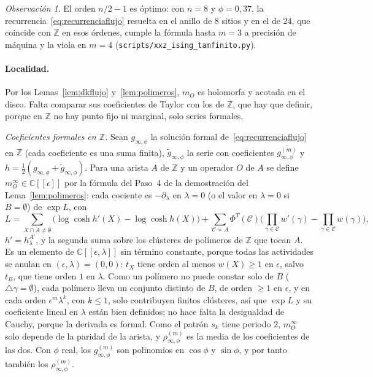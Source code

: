 \documentclass[11pt,a4paper]{article}
\theoremstyle{remark}
\newtheorem*{observacion}{Observación}
\begin{document}
\begin{observacion}
El orden $n/2-1$ es óptimo: con $n=8$ y $\phi=0{,}37$, la recurrencia~\eqref{eq:recurrenciaflujo}
resuelta en el anillo de $8$ sitios y en el de $24$, que coincide con $\mathbb Z$ en esos órdenes, cumple
la fórmula hasta $m=3$ a precisión de máquina y la viola en $m=4$ (\texttt{scripts/xxz\_ising\_tamfinito.py}).
\end{observacion}

\paragraph{Localidad.} Por los Lemas~\ref{lem:dkflujo} y~\ref{lem:polimeros}, $m_O$ es holomorfa y
acotada en el disco. Falta comparar sus coeficientes de Taylor con los de $\mathbb Z$, que hay que
definir, porque en $\mathbb Z$ no hay punto fijo ni marginal, solo series formales.

\emph{Coeficientes formales en $\mathbb Z$.} Sean $g_{\infty,\phi}$ la solución formal
de~\eqref{eq:recurrenciaflujo} en $\mathbb Z$ (cada coeficiente es una suma finita), $\tilde g_{\infty,\phi}$ la
serie con coeficientes $\overline{g^{(m)}_{\infty,\phi}}$ y $h=\tfrac12(g_{\infty,\phi}+\tilde g_{\infty,\phi})$. Para
una arista $A$ de $\mathbb Z$ y un operador $O$ de $A$ se define $m^\infty_O\in\mathbb C[[\epsilon]]$ por la fórmula
del Paso~4 de la demostración del Lema~\ref{lem:polimeros}: cada cociente es $-\partial_\lambda$ en $\lambda=0$
(o el valor en $\lambda=0$ si $B=\emptyset$) de $\exp L$, con
\[
  L=\sum_{X\cap A\ne\emptyset}\big(\log\cosh h'(X)-\log\cosh h(X)\big)
  +\sum_{\mathcal C\not\sim A}\Phi^T(\mathcal C)\Big(\prod_{\gamma\in\mathcal C}w'(\gamma)-\prod_{\gamma\in\mathcal C}w(\gamma)\Big),
\]
$h'=h^{A'}_\lambda$, y la segunda suma sobre los clústeres de polímeros de $\mathbb Z$ que tocan $A$. Es un
elemento de $\mathbb C[[\epsilon,\lambda]]$ sin término constante, porque todas las actividades se anulan en
$(\epsilon,\lambda)=(0,0)$: $t_X$ tiene orden al menos $w(X)\ge1$ en $\epsilon$, salvo $t_B$, que tiene orden $1$
en $\lambda$. Como un polímero no puede constar solo de $B$ ($\triangle\gamma=\emptyset$), cada polímero lleva un
conjunto distinto de $B$, de orden $\ge1$ en $\epsilon$, y en cada orden $\epsilon^m\lambda^k$, con $k\le1$, solo
contribuyen finitos clústeres,
así que $\exp L$ y su coeficiente lineal en $\lambda$ están bien definidos; no hace falta la desigualdad de
Cauchy, porque la derivada es formal. Como el patrón $s_k$ tiene periodo $2$, $m^\infty_{O}$ solo
depende de la paridad de la arista, y $\rho^{(m)}_{\infty,\phi}$ es la media de los coeficientes de las dos.
Con $\phi$ real, los $g^{(m)}_{\infty,\phi}$ son polinomios en $\cos\phi$ y $\sin\phi$, y por tanto también los
$\rho^{(m)}_{\infty,\phi}$.
\end{document}
